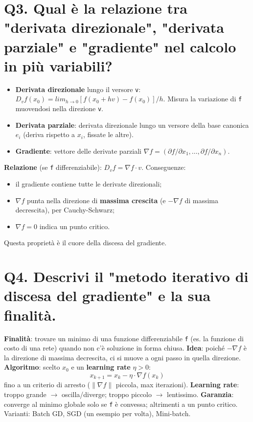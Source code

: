 \documentclass[11pt,a4paper]{article}
\begin{document}
\section*{Q3. Qual è la relazione tra "derivata direzionale", "derivata parziale" e "gradiente" nel calcolo in più variabili?}
\begin{itemize}
\item \textbf{Derivata direzionale} lungo il versore \texttt{v}: $D_{v}f(x_{0}) = lim_{h\to 0} [f(x_{0}+hv) - f(x_{0})]/h$. Misura la variazione di \texttt{f} muovendosi nella direzione \texttt{v}.
\item \textbf{Derivata parziale}: derivata direzionale lungo un versore della base canonica $e_{i}$ (deriva rispetto a $x_{i}$, fissate le altre).
\item \textbf{Gradiente}: vettore delle derivate parziali $\nabla f = (\partial f/\partial x_{1}, \dots , \partial f/\partial x_{n})$.
\end{itemize}
\textbf{Relazione} (se \texttt{f} differenziabile): $D_{v}f = \nabla f \cdot  v$. Conseguenze:
\begin{itemize}
\item il gradiente contiene tutte le derivate direzionali;
\item $\nabla f$ punta nella direzione di \textbf{massima crescita} (e $-\nabla f$ di massima decrescita), per Cauchy-Schwarz;
\item $\nabla f = 0$ indica un punto critico.
\end{itemize}
Questa proprietà è il cuore della discesa del gradiente.
\newpage
\section*{Q4. Descrivi il "metodo iterativo di discesa del gradiente" e la sua finalità.}
\textbf{Finalità}: trovare un minimo di una funzione differenziabile \texttt{f} (es. la funzione di costo di una rete) quando non c'è soluzione in forma chiusa.
\textbf{Idea}: poiché $-\nabla f$ è la direzione di massima decrescita, ci si muove a ogni passo in quella direzione.
\textbf{Algoritmo}: scelto $x_{0}$ e un \textbf{learning rate} $\eta  > 0$:
\[ x_{k+1} = x_{k} - \eta  \cdot  \nabla f(x_{k}) \]
fino a un criterio di arresto ($\|\nabla f\|$ piccola, max iterazioni).
\textbf{Learning rate}: troppo grande $\to $ oscilla/diverge; troppo piccolo $\to $ lentissimo. \textbf{Garanzia}: converge al minimo globale solo se \texttt{f} è convessa; altrimenti a un punto critico. Varianti: Batch GD, SGD (un esempio per volta), Mini-batch.
\newpage
\end{document}
